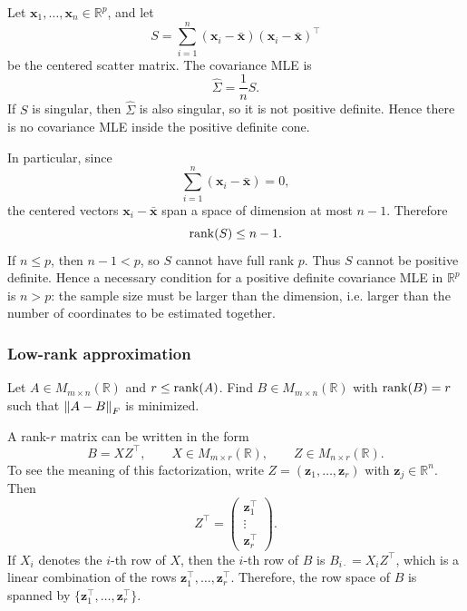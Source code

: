 \begin{remark}
Let $\mathbf{x}_1,\ldots,\mathbf{x}_n\in\mathbb{R}^p$, and let
\[
    S
    =
    \sum_{i=1}^n
    (\mathbf{x}_i-\bar{\mathbf{x}})
    (\mathbf{x}_i-\bar{\mathbf{x}})^\top
\]
be the centered scatter matrix. The covariance MLE is
\[
    \widehat{\Sigma}
    =
    \frac{1}{n}S.
\]
If $S$ is singular, then $\widehat{\Sigma}$ is also singular, so it is not
positive definite. Hence there is no covariance MLE inside the positive
definite cone.

In particular, since
\[
    \sum_{i=1}^n(\mathbf{x}_i-\bar{\mathbf{x}})=0,
\]
the centered vectors $\mathbf{x}_i-\bar{\mathbf{x}}$ span a space of dimension
at most $n-1$. Therefore
\[
    \operatorname{rank}(S)\le n-1.
\]
If $n\le p$, then $n-1<p$, so $S$ cannot have full rank $p$. Thus $S$ cannot
be positive definite. Hence a necessary condition for a positive definite
covariance MLE in $\mathbb{R}^p$ is $n>p$: the sample size must be larger than
the dimension, i.e. larger than the number of coordinates to be estimated
together.
\end{remark}









\subsubsection*{Low-rank approximation}

\begin{question}
Let $A\in M_{m\times n}(\mathbb{R})$ and $r\le\operatorname{rank}(A)$. Find $B\in M_{m\times n}(\mathbb{R})$ with $\operatorname{rank}(B)=r$ such that $\left\lVert A-B \right\rVert_F$ is minimized.
\end{question}

A rank-$r$ matrix can be written in the form
\[
    B=XZ^{\top},
    \qquad
    X\in M_{m\times r}(\mathbb{R}),
    \qquad
    Z\in M_{n\times r}(\mathbb{R}).
\]
To see the meaning of this factorization, write $Z=(\mathbf{z}_1,\ldots,\mathbf{z}_r)$ with $\mathbf{z}_j\in\mathbb{R}^n$.
Then
\[
    Z^{\top}=
    \begin{pmatrix}
        \mathbf{z}_1^{\top}\\
        \vdots\\
        \mathbf{z}_r^{\top}
    \end{pmatrix}.
\]
If $X_i$ denotes the $i$-th row of $X$, then the $i$-th row of $B$ is $B_{i\cdot}=X_iZ^{\top}$,
which is a linear combination of the rows $\mathbf{z}_1^{\top},\ldots,\mathbf{z}_r^{\top}$.
Therefore, the row space of $B$ is spanned by $\{\mathbf{z}_1^{\top},\ldots,\mathbf{z}_r^{\top}\}$.

